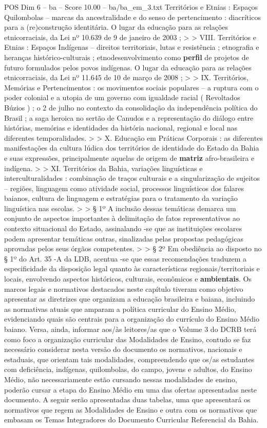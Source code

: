 \begin{textsample}{POS Dim 6 – ba – Score 10.00 – ba/ba\_em\_3.txt}
Territórios e Etnias : Espaços Quilombolas – marcas da ancestralidade e do senso de pertencimento : diacríticos para a (re)construção identitária.
O lugar da educação para as relações etnicorraciais, da Lei nº 10.639 de 9 de janeiro de 2003 ; > > VIII.
Territórios e Etnias : Espaços Indígenas – direitos territoriais, lutas e resistência ; etnografia e heranças histórico-culturais ; etnodesenvolvimento como \textbf{perfil} de projetos de futuro formulados pelos povos indígenas.
O lugar da educação para as relações etnicorraciais, da Lei nº 11.645 de 10 de março de 2008 ; > > IX.
Territórios, Memórias e Pertencimentos : os movimentos sociais populares – a ruptura com o poder colonial e a utopia de um governo com igualdade racial ( Revoltados Búzios ) ; o 2 de julho no contexto da consolidação da independência política do Brasil ; a saga heroica no sertão de Canudos e a representação do diálogo entre histórias, memórias e identidades da história nacional, regional e local nas diferentes temporalidades. > > X.
Educação em Práticas Corporais : as diferentes manifestações da cultura lúdica dos territórios de identidade do Estado da Bahia e suas expressões, principalmente aquelas de origem de \textbf{matriz} afro-brasileira e indígena. > > XI.
Territórios da Bahia, variações linguísticas e interculturalidades : combinação de traços culturais e a singularização de sujeitos – regiões, linguagem como atividade social, processos linguísticos dos falares baianos, cultura de linguagem e estratégias para o tratamento da variação linguística nas escolas. > > § 1º A inclusão dessas temáticas demarca um conjunto de aspectos importantes à delimitação de fatos representativos ao contexto situacional do Estado, assinalando -se que as instituições escolares podem apresentar temáticas outras, sinalizadas pelas propostas pedagógicas aprovadas pelos seus órgãos competentes. > > § 2º Em obediência ao disposto no § 1º do Art. 35 -A da LDB, acentua -se que essas recomendações traduzem a especificidade da disposição legal quanto às características regionais/territoriais e locais, envolvendo aspectos históricos, culturais, econômicos e \textbf{ambientais}.
Os marcos legais e normativos destacados neste capítulo tiveram como objetivo apresentar as diretrizes que organizam a educação brasileira e baiana, incluindo as normativas atuais que amparam a política curricular do Ensino Médio, evidenciando quais são centrais para a organização do currículo do Ensino Médio baiano.
Versa, ainda, informar aos/às leitores/as que o Volume 3 do DCRB terá como foco a organização curricular das Modalidades de Ensino, contudo se faz necessário considerar nesta versão do documento os normativos, nacionais e estaduais, que orientam tais modalidades, compreendendo que os/as estudantes com deficiência, indígenas, quilombolas, do campo, jovens e adultos, do Ensino Médio, não necessariamente estão cursando nessas modalidades de ensino, poderão cursar a etapa do Ensino Médio em uma das ofertas apresentadas neste documento.
A seguir serão apresentadas duas tabelas, uma que apresentará os normativos que regem as Modalidades de Ensino e outra com os normativos que embasam os Temas Integradores do Documento Curricular Referencial da Bahia.


\end{textsample}
